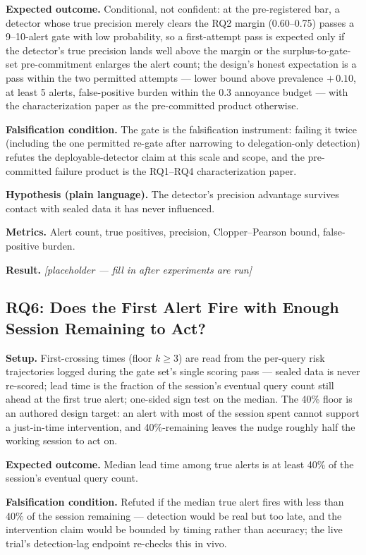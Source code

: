 \documentclass[11pt]{article}
\begin{document}
\textbf{Expected outcome.} Conditional, not confident: at the pre-registered bar, a detector whose true precision merely clears the RQ2 margin (0.60--0.75) passes a 9--10-alert gate with low probability, so a first-attempt pass is expected only if the detector's true precision lands well above the margin or the surplus-to-gate-set pre-commitment enlarges the alert count; the design's honest expectation is a pass within the two permitted attempts --- lower bound above prevalence $+\,0.10$, at least 5 alerts, false-positive burden within the 0.3 annoyance budget --- with the characterization paper as the pre-committed product otherwise.

\textbf{Falsification condition.} The gate is the falsification instrument: failing it twice (including the one permitted re-gate after narrowing to delegation-only detection) refutes the deployable-detector claim at this scale and scope, and the pre-committed failure product is the RQ1--RQ4 characterization paper.

\textbf{Hypothesis (plain language).} The detector's precision advantage survives contact with sealed data it has never influenced.

\textbf{Metrics.} Alert count, true positives, precision, Clopper--Pearson bound, false-positive burden.

\textbf{Result.} \emph{[placeholder --- fill in after experiments are run]}

\subsection{RQ6: Does the First Alert Fire with Enough Session Remaining to Act?}

\textbf{Setup.} First-crossing times (floor $k \geq 3$) are read from the per-query risk trajectories logged during the gate set's single scoring pass --- sealed data is never re-scored; lead time is the fraction of the session's eventual query count still ahead at the first true alert; one-sided sign test on the median. The 40\% floor is an authored design target: an alert with most of the session spent cannot support a just-in-time intervention, and 40\%-remaining leaves the nudge roughly half the working session to act on.

\textbf{Expected outcome.} Median lead time among true alerts is at least 40\% of the session's eventual query count.

\textbf{Falsification condition.} Refuted if the median true alert fires with less than 40\% of the session remaining --- detection would be real but too late, and the intervention claim would be bounded by timing rather than accuracy; the live trial's detection-lag endpoint re-checks this in vivo.
\end{document}
